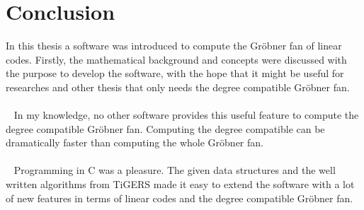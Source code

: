 \section{Conclusion}

In this thesis a software was introduced to compute the Gröbner fan of linear codes. Firstly, the mathematical background and concepts were discussed with the purpose to develop the software, with the hope that it might be useful for researches and other thesis that only needs the degree compatible Gröbner fan.\\
\\~
In my knowledge, no other software provides this useful feature to compute the degree compatible Gröbner fan. Computing the degree compatible can be dramatically faster than computing the whole Gröbner fan.\\
\\~
Programming in C was a pleasure. The given data structures and the well written algorithms from TiGERS \cite{tigers} made it easy to extend the software with a lot of new features in terms of linear codes and the degree compatible Gröbner fan.  